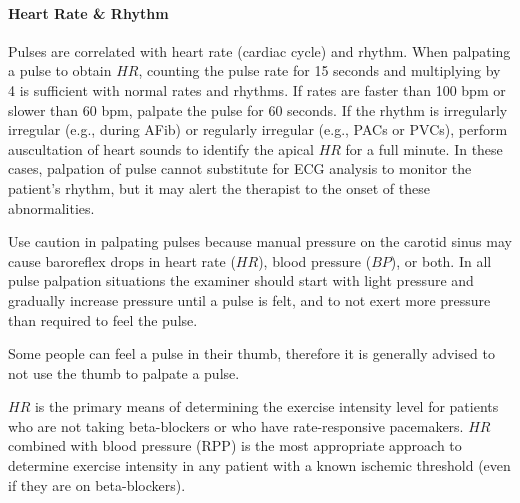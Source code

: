 \paragraph{Heart Rate \& Rhythm}

Pulses are correlated with heart rate (cardiac cycle) and rhythm. When palpating a pulse to obtain $HR$, counting the pulse rate for 15 seconds and multiplying by 4 is sufficient with normal rates and rhythms. If rates are faster than 100 bpm or slower than 60 bpm, palpate the pulse for 60 seconds. If the rhythm is irregularly irregular (e.g., during AFib) or regularly irregular (e.g., PACs or PVCs), perform auscultation of heart sounds to identify the apical $HR$ for a full minute. In these cases, palpation of pulse cannot substitute for ECG analysis to monitor the patient’s rhythm, but it may alert the therapist to the onset of these abnormalities.

Use caution in palpating pulses because manual pressure on the carotid sinus may cause baroreflex drops in heart rate ($HR$), blood pressure ($BP$), or both. In all pulse palpation situations the examiner should start with light pressure and gradually increase pressure until a pulse is felt, and to not exert more pressure than required to feel the pulse.

Some people can feel a pulse in their thumb, therefore it is generally advised to not use the thumb to palpate a pulse.

$HR$ is the primary means of determining the exercise intensity level for patients who are not taking beta-blockers or who have rate-responsive pacemakers. $HR$ combined with blood pressure (RPP) is the most appropriate approach to determine exercise intensity in any patient with a known ischemic threshold (even if they are on beta-blockers).

